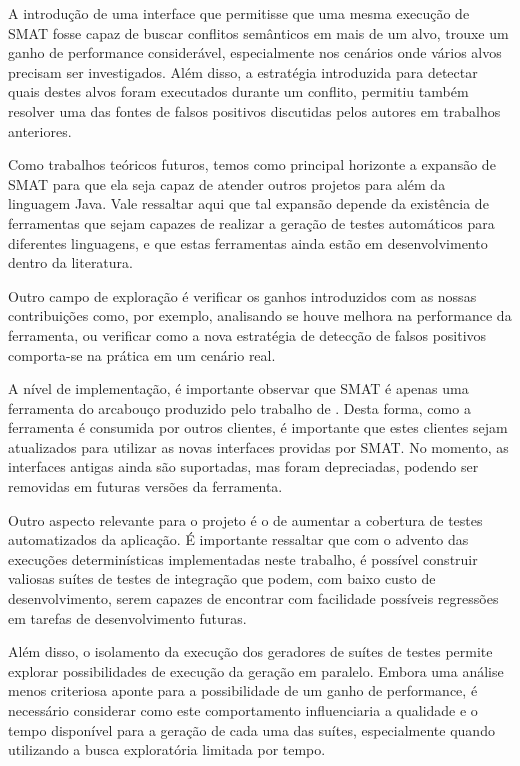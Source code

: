 \documentclass[12pt]{article}
\begin{document}
A introdução de uma interface que permitisse que uma mesma execução de SMAT fosse capaz de buscar conflitos semânticos em mais de um alvo, trouxe um ganho de performance considerável, especialmente nos cenários onde vários alvos precisam ser investigados. Além disso, a estratégia introduzida para detectar quais destes alvos foram executados durante um conflito, permitiu também resolver uma das fontes de falsos positivos discutidas pelos autores em trabalhos anteriores. 

Como trabalhos teóricos futuros, temos como principal horizonte a expansão de SMAT para que ela seja capaz de atender outros projetos para além da linguagem Java. Vale ressaltar aqui que tal expansão depende da existência de ferramentas que sejam capazes de realizar a geração de testes automáticos para diferentes linguagens, e que estas ferramentas ainda estão em desenvolvimento dentro da literatura.	

Outro campo de exploração é verificar os ganhos introduzidos com as nossas contribuições como, por exemplo, analisando se houve melhora na performance da ferramenta, ou verificar como a  nova estratégia de detecção de falsos positivos comporta-se na prática em um cenário real.

A nível de implementação, é importante observar que SMAT é apenas uma ferramenta do arcabouço produzido pelo trabalho de \cite{leuson:tese}. Desta forma, como a ferramenta é consumida por outros clientes, é importante que estes clientes sejam atualizados para utilizar as novas interfaces providas por SMAT. No momento, as interfaces antigas ainda são suportadas, mas foram depreciadas, podendo ser removidas em futuras versões da ferramenta.

Outro aspecto relevante para o projeto é o de aumentar a cobertura de testes automatizados da aplicação. É importante ressaltar que com o advento das execuções determinísticas implementadas neste trabalho, é possível construir valiosas suítes de testes de integração que podem, com baixo custo de desenvolvimento, serem capazes de encontrar com facilidade possíveis regressões em tarefas de desenvolvimento futuras.

Além disso, o isolamento da execução dos geradores de suítes de testes permite explorar possibilidades de execução da geração em paralelo. Embora uma análise menos criteriosa aponte para a possibilidade de um ganho de performance, é necessário considerar como este comportamento influenciaria a qualidade e o tempo disponível para a geração de cada uma das suítes, especialmente quando utilizando a busca exploratória limitada por tempo.
\end{document}
